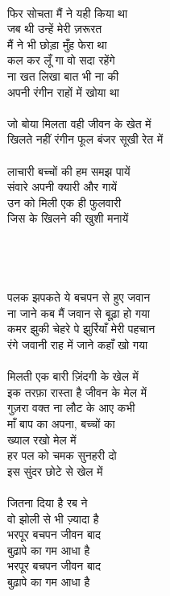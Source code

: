 {{{{{{{{{{{{{{{{{{{{{{{{{{{{{{{{{{{{{{{{{{{\\
फिर सोचता मैं ने यही किया था\\
जब थी उन्हें मेरी ज़रूरत\\
मैं ने भी छोड़ा मुँह फेरा था\\
कल कर लूँ गा वो सदा रहेंगे\\
ना खत लिखा बात भी ना की\\
अपनी रंगीन राहों में खोया था\\
\\
जो बोया मिलता वही जीवन के खेत में\\
खिलते नहीं रंगीन फूल बंजर सूखी रेत में\\
\\
लाचारी बच्चों की हम समझ पायें\\
संवारे अपनी क्यारी और गायें\\
उन को मिली एक ही फुलवारी\\
जिस के खिलने की खुशी मनायें\\
\\
\\
\\
\\
पलक झपकते ये बचपन से हुए जवान\\
ना जाने कब मैं जवान से बूढ़ा हो गया\\
कमर झुकी चेहरे पे झुर्रियाँ मेरी पहचान\\
रंगे जवानी राह में जाने कहाँ खो गया\\
\\
मिलती एक बारी ज़िंदगी के खेल में\\
इक तरफ़ा रास्ता है जीवन के मेल में\\
गुज़रा वक्त ना लौट के आए कभी\\
माँ बाप का अपना, बच्चों का\\
ख्याल रखो मेल में\\
हर पल को चमक सुनहरी दो\\
इस सुंदर छोटे से खेल में\\
\\
जितना दिया है रब ने\\
वो झोली से भी ज़्यादा है\\
भरपूर बचपन जीवन बाद\\
बुढ़ापे का गम आधा है\\
भरपूर बचपन जीवन बाद\\
बुढ़ापे का गम आधा है\\
}}}}}}}}}}}}}}}}}}}}}}}}}}}}}}}}}}}}}}}}}}}

